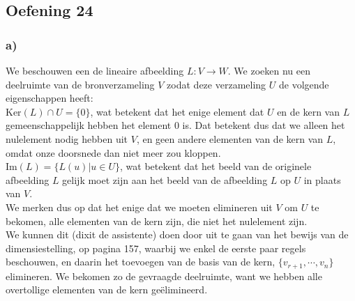 \documentclass[lineaire_algebra_oplossingen.tex]{subfiles}
\begin{document}
\subsection{Oefening 24}
\subsubsection*{a)}
We beschouwen een de lineaire afbeelding $L:V\rightarrow W$. We zoeken nu een deelruimte van de bronverzameling $V$ zodat deze verzameling $U$ de volgende eigenschappen heeft:\\
$\text{Ker}(L)\cap U = \{0\}$, wat betekent dat het enige element dat $U$ en de kern van $L$ gemeenschappelijk hebben het element $0$ is. Dat betekent dus dat we alleen het nulelement nodig hebben uit $V$, en geen andere elementen van de kern van $L$, omdat onze doorsnede dan niet meer zou kloppen.\\
$\text{Im}(L) = \{L(u)| u\in U\}$, wat betekent dat het beeld van de originele afbeelding $L$ gelijk moet zijn aan het beeld van de afbeelding $L$ op $U$ in plaats van $V$.\\
We merken dus op dat het enige dat we moeten elimineren uit $V$ om $U$ te bekomen, alle elementen van de kern zijn, die niet het nulelement zijn.\\
We kunnen dit (dixit de assistente) doen door uit te gaan van het bewijs van de dimensiestelling, op pagina 157, waarbij we enkel de eerste paar regels beschouwen, en daarin het toevoegen van de basis van de kern, $\{v_{r+1},\cdots,v_n\}$ elimineren. We bekomen zo de gevraagde deelruimte, want we hebben alle overtollige elementen van de kern ge\"elimineerd.
\end{document}
